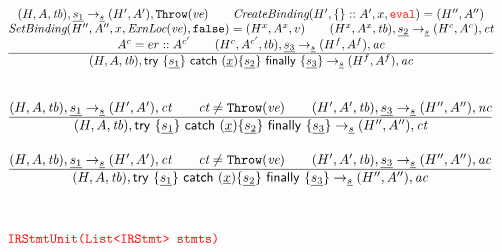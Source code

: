 \[\begin{array}{l@{~~}l@{~~}ll}
\frac{\begin{matrix}
\statel, \ir{\stmt_1} \rightarrow_{\ir\stmt} \resp, {\tt Throw}(\emph{ve})
\rulesep
\hf{CreateBinding}(H',\{\}::A',x,\eval)=\respp
\\
\hf{SetBinding}(H'', A'', x, \hf{ExnLoc}(\emph{ve}), \false) = (H^x, A^x, v)
\rulesep
(H^x,A^x,\tb), \ir{\stmt_2} \rightarrow_{\ir\stmt} (H^c,A^c), \ct
\\
A^c = er::A^{c'}
\rulesep
(H^c, A^{c'}, tb), \ir{\stmt_3} \rightarrow_{\ir\stmt} (H^f, A^f), \ac
\end{matrix}}{\begin{matrix}
\state, \irtrycatfin \rightarrow_{\ir\stmt} (H^f,A^f), \ac
\end{matrix}}
\\[2em]

\end{array}
\]




\[
\begin{array}{l@{~~}l@{~~}ll}
\frac{\begin{matrix}
\statel, \ir{\stmt_1} \rightarrow_{\ir\stmt} \resp, \ct
\rulesep
\ct \not= {\tt Throw}(\emph{ve})
\rulesep
\statepl, \ir{\stmt_3} \rightarrow_{\ir\stmt} \respp, \nc
\end{matrix}}{\begin{matrix}
\state, \irtrycatfin \rightarrow_{\ir\stmt} \respp, \ct
\end{matrix}}
\\[2em]

\frac{\begin{matrix}
\statel, \ir{\stmt_1} \rightarrow_{\ir\stmt} \resp, \ct
\rulesep
\ct \not= {\tt Throw}(\emph{ve})
\rulesep
\statepl, \ir{\stmt_3} \rightarrow_{\ir\stmt} \respp, \ac
\end{matrix}}{\begin{matrix}
\state, \irtrycatfin \rightarrow_{\ir\stmt} \respp, \ac
\end{matrix}}
\\[4em]

\mtt{\normalsize\inred IRStmtUnit(List<IRStmt> stmts)}\\[4em]

\end{array}
\]


